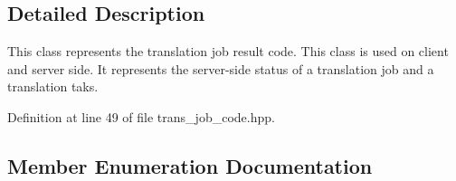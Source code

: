 \subsection{Detailed Description}
This class represents the translation job result code. This class is used on client and server side. It represents the server-\/side status of a translation job and a translation taks. 

Definition at line 49 of file trans\+\_\+job\+\_\+code.\+hpp.



\subsection{Member Enumeration Documentation}
\hypertarget{classuva_1_1smt_1_1bpbd_1_1common_1_1messaging_1_1trans__job__code_af641dab8b5a194daece857d972f5351f}{}

